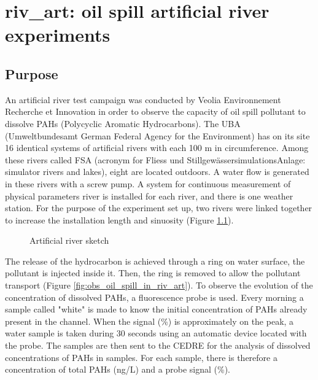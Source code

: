 \chapter{riv\_art: oil spill artificial river experiments}
%
%
\section{Purpose}
%
An artificial river test campaign was conducted by Veolia Environnement
Recherche et Innovation in order to observe the capacity of oil spill pollutant
to dissolve PAHs (Polycyclic Aromatic Hydrocarbons).
The UBA (Umweltbundesamt German Federal Agency for the Environment) has on its
site 16 identical systems of artificial rivers with each 100 m in circumference.
Among these rivers called FSA (acronym for Fliess und
StillgewässersimulationsAnlage: simulator rivers and lakes), eight are located
outdoors.
A water flow is generated in these rivers with a screw pump.
A system for continuous measurement of physical parameters river is installed
for each river, and there is one weather station.
For the purpose of the experiment set up, two rivers were linked together to
increase the installation length and sinuosity (Figure \ref{fig:riv_art}).

\begin{figure}[htbp]
  \begin{center}
  \end{center}
  \caption{Artificial river sketch}
  \label{fig:riv_art}
\end{figure}

The release of the hydrocarbon is achieved through a ring on water surface,
the pollutant is injected inside it.
Then, the ring is removed to allow the pollutant transport
(Figure \ref{fig:obs_oil_spill_in_riv_art}).
To observe the evolution of the concentration of dissolved PAHs, a fluorescence
probe is used.
Every morning a sample called "white" is made to know the initial concentration
of PAHs already present in the channel.
When the signal (\%) is approximately on the peak, a water sample is taken
during 30 seconds using an automatic device located with the probe.
The samples are then sent to the CEDRE for the analysis of dissolved
concentrations of PAHs in samples.
For each sample, there is therefore a concentration of total PAHs (ng/L) and a
probe signal (\%).

